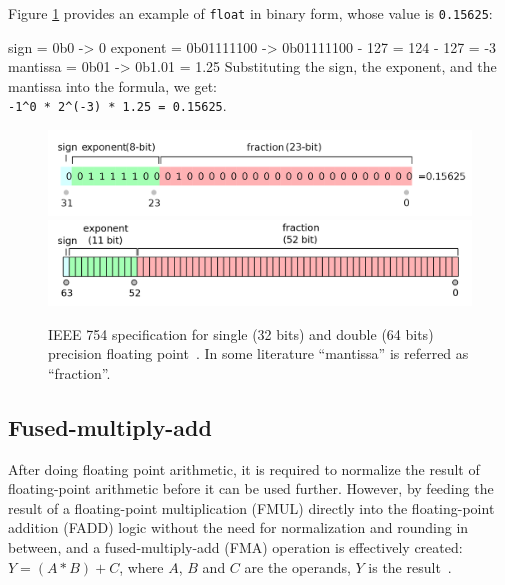 \documentclass[logo,bsc,singlespacing,parskip]{infthesis}
\newcommand{\dtfloat}{\texttt{float}}
\newenvironment{VerbatimCompact}
  {\vspace*{-2.5mm}\VerbatimEnvironment
   \par\Verbatim}
  {\endVerbatim\vspace*{-2.4mm}}
\begin{document}
Figure \ref{fig:ieee-f32} provides an example of \dtfloat{} in binary form, whose value is \texttt{0.15625}:
\begin{VerbatimCompact}
sign     = 0b0        -> 0
exponent = 0b01111100 -> 0b01111100 - 127 = 124 - 127 = -3
mantissa = 0b01       -> 0b1.01 = 1.25
\end{VerbatimCompact}
Substituting the sign, the exponent, and the mantissa into the formula, we get: \\
\texttt{-1\^{}0 * 2\^{}(-3) * 1.25 = 0.15625}.



\begin{figure}
    \begin{center}
        \includegraphics[width=\linewidth]{image/ieee-f32.png}
        \includegraphics[width=\linewidth]{image/ieee-f64.png}
        \caption{IEEE 754 specification for single (32 bits) and double (64 bits) precision floating point~\cite{ieee754-diagram}. In some literature ``mantissa'' is referred as ``fraction''.}
        \label{fig:ieee-f32}
    \end{center}
\end{figure}

\subsection{Fused-multiply-add}
\label{sec:FMA}

After doing floating point arithmetic, it is required to normalize the result of floating-point arithmetic before it can be used further. However, by feeding the result of a floating-point multiplication (FMUL) directly into the floating-point addition (FADD) logic without the need for normalization and rounding in between, and a fused-multiply-add (FMA) operation is effectively created: 
\begin{math}Y = (A * B) + C \end{math}, where 
\begin{math}A\end{math},
\begin{math}B\end{math} and
\begin{math}C\end{math} are the operands, 
\begin{math}Y\end{math} is the result~\cite{CARD}.
\end{document}
